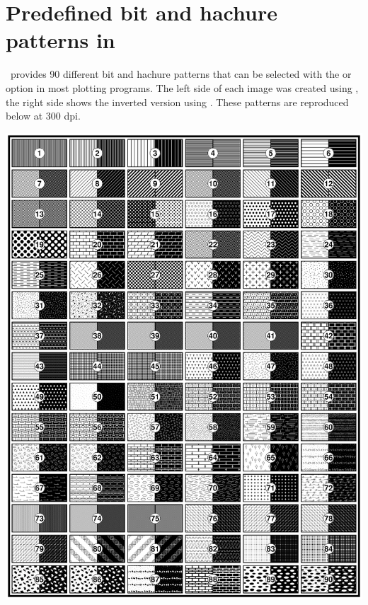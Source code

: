 %
%
\chapter{Predefined bit and hachure patterns in \gmt}
\label{app:E}
\thispagestyle{headings}

\GMT\ provides 90 different bit and hachure patterns that can be
selected with the  or  option in most plotting programs.
The left side of each image was created using , the right side
shows the inverted version using .
These patterns are reproduced below at 300 dpi.

\begin{center}
\includegraphics{scripts/GMT_App_E}
\end{center}
